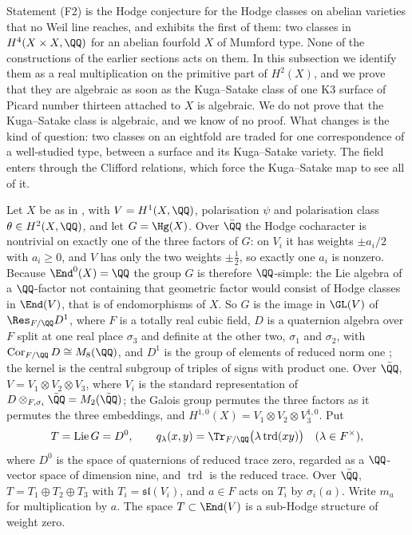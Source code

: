 Statement (F2) is the Hodge conjecture for the Hodge classes on abelian
varieties that no Weil line reaches, and  exhibits
the first of them: two classes in $H^{4}(X\times X,\QQ)$ for an abelian
fourfold $X$ of Mumford type. None of the constructions of the earlier
sections acts on them. In this subsection we identify them as a real
multiplication on the primitive part of $H^{2}(X)$, and we prove that they
are algebraic as soon as the Kuga--Satake class of one K3 surface of Picard
number thirteen attached to $X$ is algebraic. We do not prove that the
Kuga--Satake class is algebraic, and we know of no proof. What changes is the
kind of question: two classes on an eightfold are traded for one
correspondence of a well-studied type, between a surface and its Kuga--Satake
variety. The field enters through the Clifford relations, which force the
Kuga--Satake map to see all of it.

\begin{setupenv}\label{setup:mumford}
Let $X$ be as in , with $V=H^{1}(X,\QQ)$,
polarisation $\psi$ and polarisation class $\theta\in H^{2}(X,\QQ)$, and let
$G=\Hg(X)$. Over $\bar{\QQ}$ the Hodge cocharacter is nontrivial on exactly
one of the three factors of $G$: on $V_{i}$ it has weights $\pm a_{i}/2$ with
$a_{i}\ge0$, and $V$ has only the two weights $\pm\frac12$, so exactly one
$a_{i}$ is nonzero. Because
$\End^{0}(X)=\QQ$ the group $G$ is therefore $\QQ$-simple: the Lie algebra of
a $\QQ$-factor not containing that geometric factor would consist of Hodge
classes in $\End(V)$, that is of endomorphisms of $X$. So $G$ is the image in
$\GL(V)$ of $\Res_{F/\QQ}D^{1}$, where $F$ is a totally real cubic field, $D$
is a quaternion algebra over $F$ split at one real place $\sigma_{3}$ and
definite at the other two, $\sigma_{1}$ and $\sigma_{2}$, with
$\operatorname{Cor}_{F/\QQ}D\cong M_{8}(\QQ)$, and $D^{1}$ is the group of
elements of reduced norm one \cite{Mum69,Gal00}; the kernel is the central
subgroup of triples of signs with product one. Over $\bar{\QQ}$,
$V=V_{1}\otimes V_{2}\otimes V_{3}$, where $V_{i}$ is the standard
representation of $D\otimes_{F,\sigma_{i}}\bar{\QQ}=M_{2}(\bar{\QQ})$; the
Galois group permutes the three factors as it permutes the three embeddings,
and $H^{1,0}(X)=V_{1}\otimes V_{2}\otimes V_{3}^{1,0}$. Put
\[
  T=\operatorname{Lie}G=D^{0},
  \qquad
  q_{\lambda}(x,y)=\Tr_{F/\QQ}\bigl(\lambda\operatorname{trd}(xy)\bigr)
  \quad(\lambda\in F^{\times}),
\]
where $D^{0}$ is the space of quaternions of reduced trace zero, regarded as
a $\QQ$-vector space of dimension nine, and $\operatorname{trd}$ is the
reduced trace. Over $\bar{\QQ}$, $T=T_{1}\oplus T_{2}\oplus T_{3}$ with
$T_{i}=\mathfrak{sl}(V_{i})$, and $a\in F$ acts on $T_{i}$ by $\sigma_{i}(a)$.
Write $m_{a}$ for multiplication by $a$. The space $T\subset\End(V)$ is a
sub-Hodge structure of weight zero.
\end{setupenv}

